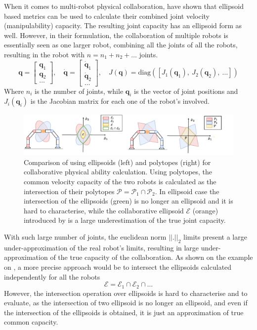 When it comes to multi-robot physical collaboration, \citet{chiacchio_global_1991} have shown that ellipsoid based metrics can be used to calculate their combined joint velocity (manipulability) capacity. The resulting joint capacity has an ellipsoid form as well.  However, in their formulation, the collaboration of multiple robots is essentially seen as one larger robot, combining all the joints of all the robots, resulting in the robot with $n=n_1 + n_2 + \ldots$ joints.
\begin{equation}
    \bm{q} = \begin{bmatrix}
        \bm{q}_1\\ \bm{q}_2 \\ \ldots
    \end{bmatrix}, \quad
    \dot{\bm{q}} = \begin{bmatrix}
        \dot{\bm{q}}_1\\\dot{\bm{q}}_2 \\ \ldots
    \end{bmatrix}, \quad
    J(\bm{q}) = \text{diag}([J_1(\bm{q}_1),~ J_2(\bm{q}_2),~\ldots])
\end{equation} 
Where $n_i$ is the number of joints, while $\bm{q}_i$ is the vector of joint positions and $J_i(\bm{q}_i)$ is the Jacobian matrix for each one of the robot's involved.

\begin{figure}[!h]
    \centering
    \includegraphics[width=1.05\linewidth]{Chapters/imgs/collab_manip_poly.pdf}
    \caption{Comparison of using ellipsoids (left) and polytopes (right) for collaborative physical ability calculation. Using polytopes, the common velocity capacity of the two robots is calculated as the intersection of their polytopes $\mathcal{P}=\mathcal{P}_1 \cap \mathcal{P}_2$. In ellipsoid case the intersection of the ellipsoids (green) is no longer an ellipsoid and it is hard to characterise, while the collaborative ellipsoid $\mathcal{E}$ (orange) introduced by \citet{chiacchio_global_1991} is a large underestimation of the true joint capacity.}
    \label{fig:collab_mani_poly}
\end{figure}
With such large number of joints, the euclidean norm $||.||_2$ limits present a large under-approximation of the real robot's limits, resulting in large under-approximation of the true capacity of the collaboration. As shown on the example on , a more precise approach would be to intersect the ellipsoids calculated independently for all the robots $$\mathcal{E}=\mathcal{E}_1 \cap \mathcal{E}_2  \cap \ldots$$ However, the intersection operation over ellipsoids is hard to characterise and to evaluate, as the intersection of two ellipsoid is no longer an ellipsoid, and even if the intersection of the ellipsoids is obtained, it is just an approximation of true common capacity. 

